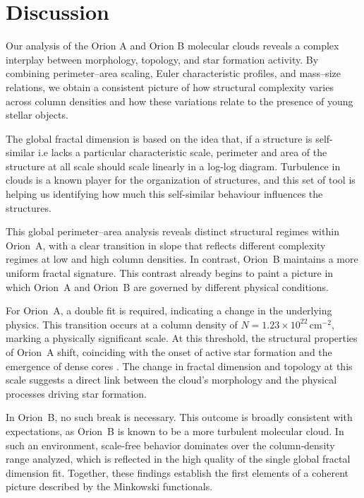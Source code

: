 \chapter{Discussion}

Our analysis of the Orion A and Orion B molecular clouds reveals a complex interplay between morphology, topology, and star formation activity. 
By combining perimeter–area scaling, Euler characteristic profiles, and mass–size relations, we obtain a consistent picture of how structural complexity varies across column densities and how these variations relate to the presence of young stellar objects.

The global fractal dimension is based on the idea that, if a structure is self-similar i.e lacks a particular characteristic scale, perimeter and area of the structure at all scale should scale linearly in a log-log diagram. 
Turbulence in clouds is a known player for the organization of structures, and this set of tool is helping us identifying how much this self-similar behaviour influences the structures.

This global perimeter–area analysis reveals distinct structural regimes within Orion~A, with a clear transition in slope that reflects different complexity regimes at low and high column densities.  
In contrast, Orion~B maintains a more uniform fractal signature.  
This contrast already begins to paint a picture in which Orion~A and Orion~B are governed by different physical conditions.

For Orion~A, a double fit is required, indicating a change in the underlying physics.  
This transition occurs at a column density of \(N = 1.23 \times 10^{22}\,\mathrm{cm}^{-2}\), marking a physically significant scale.  
At this threshold, the structural properties of Orion~A shift, coinciding with the onset of active star formation and the emergence of dense cores \cite{lada2010star}.  
The change in fractal dimension and topology at this scale suggests a direct link between the cloud's morphology and the physical processes driving star formation.

In Orion~B, no such break is necessary.  
This outcome is broadly consistent with expectations, as Orion~B is known to be a more turbulent molecular cloud.  
In such an environment, scale‑free behavior dominates over the column‑density range analyzed, which is reflected in the high quality of the single global fractal dimension fit.  
Together, these findings establish the first elements of a coherent picture described by the Minkowski functionals.

